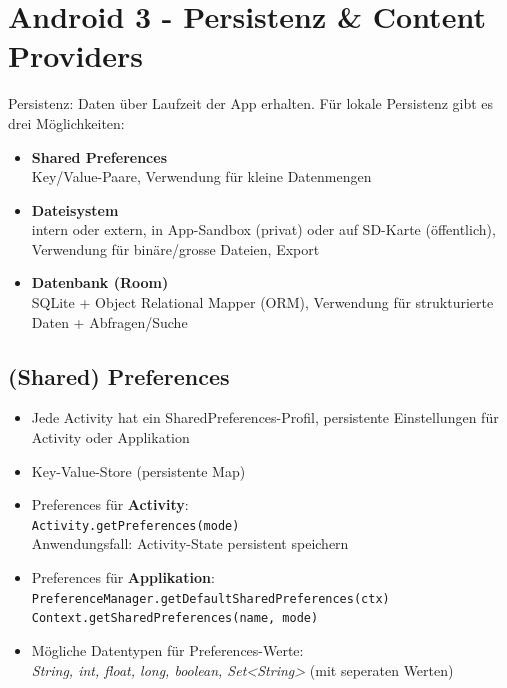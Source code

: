 \documentclass[a4paper]{article}
\begin{document}
\newpage
\section{Android 3 - Persistenz \& Content Providers}

Persistenz: Daten über Laufzeit der App erhalten.
Für lokale Persistenz gibt es drei Möglichkeiten:
\begin{itemize}
	\item \textbf{Shared Preferences}\\
	Key/Value-Paare, Verwendung für kleine Datenmengen
	\item \textbf{Dateisystem}\\
	intern oder extern, in App-Sandbox (privat) oder auf SD-Karte (öffentlich), Verwendung für binäre/grosse Dateien, Export
	\item \textbf{Datenbank (Room)}\\
	SQLite + Object Relational Mapper (ORM), Verwendung für strukturierte Daten + Abfragen/Suche
\end{itemize}

\subsection{(Shared) Preferences}
\begin{itemize}
	\item Jede Activity hat ein SharedPreferences-Profil, persistente Einstellungen für Activity oder Applikation
	\item Key-Value-Store (persistente Map)
	\item Preferences für \textbf{Activity}: \\
	\texttt{Activity.getPreferences(mode)}\\
	Anwendungsfall: Activity-State persistent speichern
	\item Preferences für \textbf{Applikation}: \\
	\texttt{PreferenceManager.getDefaultSharedPreferences(ctx)}\\
	\texttt{Context.getSharedPreferences(name, mode)}
	\item Mögliche Datentypen für Preferences-Werte:\\
	\textit{String, int, float, long, boolean, Set<String>} (mit seperaten Werten)
\end{itemize}
\end{document}
